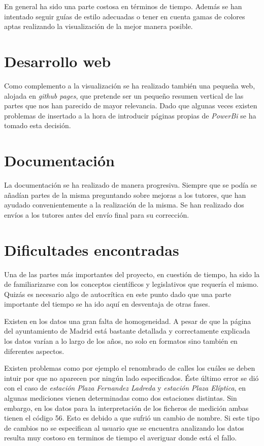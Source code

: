 En general ha sido una parte costosa en términos de tiempo. Además se han intentado seguir guías de estilo \cite{visualisation_2016} adecuadas o tener en cuenta gamas de colores aptas realizando la visualización de la mejor manera posible. 

\section{Desarrollo web}\label{dweb}

Como complemento a la visualización se ha realizado también una pequeña web, alojada en \textit{github pages}, que pretende ser un pequeño resumen vertical de las partes que nos han parecido de mayor relevancia. Dado que algunas veces existen problemas de insertado a la hora de introducir páginas propias de \textit{PowerBi} se ha tomado esta decisión.

\section{Documentación}\label{docs}

La documentación se ha realizado de manera progresiva. Siempre que se podía se añadían partes de la misma  preguntando sobre mejoras a los tutores, que han ayudado convenientemente a la realización de la misma. Se han realizado dos envíos a los tutores antes del envío final para su corrección.

\section{Dificultades encontradas}\label{inicio-proyecto}

Una de las partes más importantes del proyecto, en cuestión de tiempo, ha sido la de familiarizarse con los conceptos científicos y legislativos que requería el mismo. Quizás es necesario algo de autocrítica en este punto dado que una parte importante del tiempo se ha ido aquí en desventaja de otras fases. 

Existen en los datos una gran falta de homogeneidad. A pesar de que la página del ayuntamiento de Madrid está bastante detallada y correctamente explicada los datos varían a lo largo de los años, no solo en formatos sino también en diferentes aspectos. 

Existen problemas como por ejemplo el renombrado de calles los cuáles se deben intuir por que no aparecen por ningún lado especificados. Éste último error se dió con el caso de \textit{estación Plaza Fernandez Ladreda} y \textit{estación Plaza Elíptica}, en algunas mediciones vienen determinadas como dos estaciones distintas. Sin embargo, en los datos para la interpretación de los ficheros de medición ambas tienen el código 56. Esto es debido a que sufrió un cambio de nombre. Si este tipo de cambios no se especifican al usuario que se encuentra analizando los datos resulta muy costoso en terminos de tiempo el averiguar donde está el fallo.

